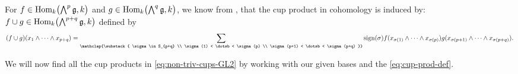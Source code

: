 For $f \in \operatorname{Hom}_{k}\bigl( \bigwedge^{p}\mathfrak{g}, k \bigr)$ and $g \in \operatorname{Hom}_{k}\bigl( \bigwedge^{q}\mathfrak{g}, k \bigr)$, we know from \cite[Chap.~XIII, Sect.~8]{CartanHomAlg}, that the cup product in cohomology is induced by: $f \cup g \in \operatorname{Hom}_{k}\bigl( \bigwedge^{p+q}\mathfrak{g}, k \bigr)$ defined by
\begin{equation}
  \label{eq:cup-prod-def}
  (f \cup g)(x_{1} \wedge \dotsb \wedge x_{p+q})  = \sum_{\mathclap{\substack{ \sigma \in S_{p+q} \\ \sigma(1) < \dotsb < \sigma(p) \\ \sigma(p+1) < \dotsb < \sigma(p+q) }}} \sign(\sigma) f(x_{\sigma(1)} \wedge \dotsb \wedge x_{\sigma(p)}) g(x_{\sigma(p+1)} \wedge \dotsb \wedge x_{\sigma(p+q)}).
\end{equation}

We will now find all the cup products in \eqref{eq:non-triv-cups-GL2} by working with our given bases and the \eqref{eq:cup-prod-def}.

